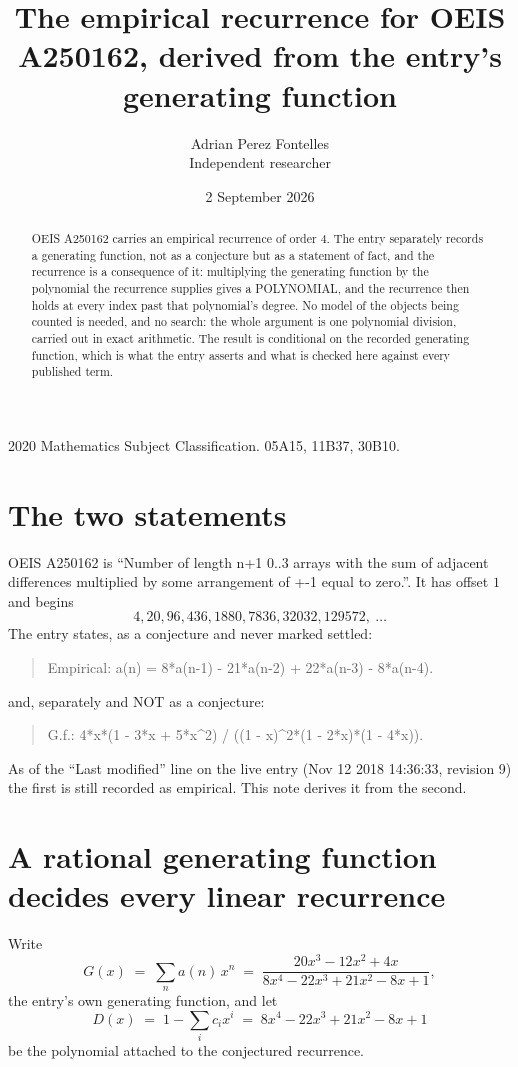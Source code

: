 \documentclass[11pt,a4paper]{article}
\title{The empirical recurrence for OEIS A250162, derived from the entry's generating function}
\author{Adrian Perez Fontelles\\ \small Independent researcher}
\date{2 September 2026}
\theoremstyle{plain}
\theoremstyle{definition}
\begin{document}
\maketitle

\begin{abstract}
OEIS A250162 carries an empirical recurrence of order $4$. The entry separately records a
generating function, not as a conjecture but as a statement of fact, and the recurrence is a
consequence of it: multiplying the generating function by the polynomial the recurrence
supplies gives a POLYNOMIAL, and the recurrence then holds at every index past that
polynomial's degree. No model of the objects being counted is needed, and no search: the
whole argument is one polynomial division, carried out in exact arithmetic. The result is
conditional on the recorded generating function, which is what the entry asserts and what is
checked here against every published term.
\end{abstract}

\noindent\small 2020 Mathematics Subject Classification. 05A15, 11B37, 30B10.\normalsize

\section{The two statements}

OEIS A250162 is ``Number of length n+1 0..3 arrays with the sum of adjacent differences multiplied by some arrangement of +-1 equal to zero.''. It has offset $1$ and begins
\[
4, 20, 96, 436, 1880, 7836, 32032, 129572,\ \dots
\]
The entry states, as a conjecture and never marked settled:
\begin{quote}
Empirical: a(n) = 8*a(n-1) - 21*a(n-2) + 22*a(n-3) - 8*a(n-4).
\end{quote}
and, separately and NOT as a conjecture:
\begin{quote}
G.f.: 4*x*(1 - 3*x + 5*x\^{}2) / ((1 - x)\^{}2*(1 - 2*x)*(1 - 4*x)).
\end{quote}
As of the ``Last modified'' line on the live entry (Nov 12 2018 14:36:33, revision 9) the first is still
recorded as empirical. This note derives it from the second.

\section{A rational generating function decides every linear recurrence}

Write
\[
G(x)\;=\;\sum_{n}a(n)\,x^{n}\;=\;\frac{20 x^{3} - 12 x^{2} + 4 x}{8 x^{4} - 22 x^{3} + 21 x^{2} - 8 x + 1},
\]
the entry's own generating function, and let
\[
D(x)\;=\;1-\sum_i c_i x^{i}\;=\;8 x^{4} - 22 x^{3} + 21 x^{2} - 8 x + 1
\]
be the polynomial attached to the conjectured recurrence.
\end{document}
